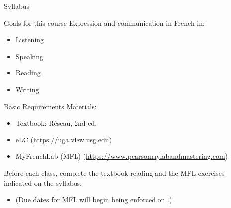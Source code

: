 \begin{frame}
  \begin{center}
    \Huge{Syllabus}
  \end{center}
\end{frame}

\begin{frame}{Goals for this course}
  Expression and communication in French in:
  \begin{itemize}
    \item Listening
    \item Speaking
    \item Reading
    \item Writing
  \end{itemize}
\end{frame}

\begin{frame}{Basic Requirements}
  Materials:
  \begin{itemize}
    \item Textbook: Réseau, 2nd ed.
    \item eLC (\url{https://uga.view.usg.edu})
    \item MyFrenchLab (MFL) (\url{https://www.pearsonmylabandmastering.com})
  \end{itemize}
  \alert{Before each class}, complete the textbook reading and the MFL exercises indicated on the syllabus.
  \begin{itemize}
    \item (Due dates for MFL will begin being enforced on \mflDue{}.)
  \end{itemize}
\end{frame}

